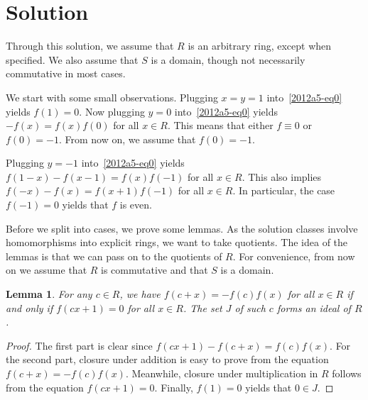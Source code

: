 \documentclass{article}
\newtheorem{lemma}{Lemma}
\begin{document}
\section*{Solution}

Through this solution, we assume that $R$ is an arbitrary ring, except when specified.
We also assume that $S$ is a domain, though not necessarily commutative in most cases.

We start with some small observations.
Plugging $x = y = 1$ into~\eqref{2012a5-eq0} yields $f(1) = 0$.
Now plugging $y = 0$ into~\eqref{2012a5-eq0} yields $-f(x) = f(x) f(0)$ for all $x \in R$.
This means that either $f \equiv 0$ or $f(0) = -1$.
From now on, we assume that $f(0) = -1$.

Plugging $y = -1$ into~\eqref{2012a5-eq0} yields $f(1 - x) - f(x - 1) = f(x) f(-1)$ for all $x \in R$.
This also implies $f(-x) - f(x) = f(x + 1) f(-1)$ for all $x \in R$.
In particular, the case $f(-1) = 0$ yields that $f$ is even.

Before we split into cases, we prove some lemmas.
As the solution classes involve homomorphisms into explicit rings, we want to take quotients.
The idea of the lemmas is that we can pass on to the quotients of $R$.
For convenience, from now on we assume that $R$ is commutative and that $S$ is a domain.

\begin{lemma}\label{2012a5-1}
For any $c \in R$, we have $f(c + x) = -f(c) f(x)$ for all $x \in R$ if and only if $f(cx + 1) = 0$ for all $x \in R$.
The set $J$ of such $c$ forms an ideal of $R$.
\end{lemma}
\begin{proof}
The first part is clear since $f(cx + 1) - f(c + x) = f(c) f(x)$.
For the second part, closure under addition is easy to prove from the equation $f(c + x) = -f(c) f(x)$.
Meanwhile, closure under multiplication in $R$ follows from the equation $f(cx + 1) = 0$.
Finally, $f(1) = 0$ yields that $0 \in J$.
\end{proof}
\end{document}
